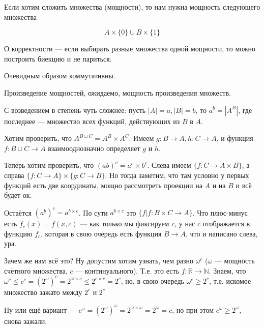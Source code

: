 
Если хотим сложить множества (мощности), то нам нужна мощность следующего множества

{
\large
$$
A \times \{0\} \cup B \times \{1\}
$$
}

О корректности --- если выбирать разные множества одной мощности, то можно построить биекцию и не париться.

Очевидным образом коммутативны.

Произведение мощностей, ожидаемо, мощность произведения множеств.

С возведением в степень чуть сложнее: пусть $|A| = a, |B| = b$, то $a^b = |A^B|$, где последнее --- множество всех функций, действующих из $B$ в $A$.

Хотим проверить, что $A^{B \sqcup C} = A^B \times A^C$. Имеем $g : B \to A, h : C \to A$, и функция $f : B \cup C \to A$ взаимооднозначно определяет $g $ и $h$.

Теперь хотим проверить, что $(ab)^c = a^c \times b^c$. Слева имеем $\{f : C \to A \times B\}$, а справа $\{ f : C \to A  \} \times \{g : C \to B\}$. Но тогда заметим, что там условно у первых функций есть две координаты, мощно рассмотреть проекции  на $A$ и на $B$ и всё будет ок.

Остаётся $(a ^ b)^c = a^{b \times c}$. По сути $a^{b \times c}$ это $\{f | f : B \times C \to A\}$. Что плюс-минус есть $f_c(x) = f(x, c)$ --- как только мы фиксируем $c$, у нас $c$ отображается в функцию $f_c$, которая в свою очередь есть функция $B \to A$, что и написано слева, ура.

Зачем же нам всё это? Ну допустим хотим узнать, чем разно $\omega^c$ ($\omega $ --- мощность счётного множества, $c$ --- континуального). Т.е. это есть $f : \mathbb{R} \to \mathbb{N}$. Знаем, что $\omega^c \le c^c = (2^{\omega})^c = 2^{\omega \times c} \le 2^{c \times c} = 2^{c}$, но, в свою очередь $\omega ^ c \ge 2^c$, т.е. искомое множество зажато между $2^c$ и $2^c$

Ну или ещё вариант --- $c^{\omega} = (2^{\omega})^{\omega} = 2^{\omega \times \omega} = 2^{\omega} = c$, но при этом $c^{\omega} \ge 2^{\omega}$, снова зажали.

